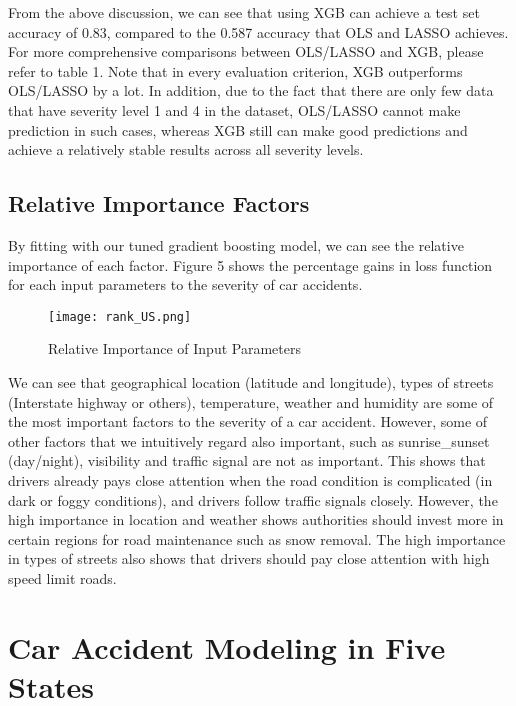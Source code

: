 \documentclass[twocolumn]{article}
\begin{document}
From the above discussion, we can see that using XGB can achieve a test set accuracy of 0.83, compared to the 0.587 accuracy that OLS and LASSO achieves. For more comprehensive comparisons between OLS/LASSO and XGB, please refer to table 1. Note that in every evaluation criterion, XGB outperforms OLS/LASSO by a lot. In addition, due to the fact that there are only few data that have severity level 1 and 4 in the dataset, OLS/LASSO cannot make prediction in such cases, whereas XGB still can make good predictions and achieve a relatively stable results across all severity levels. 


\subsection{Relative Importance Factors}
By fitting with our tuned gradient boosting model, we can see the relative importance of each factor. Figure 5 shows the percentage gains in loss function for each input parameters to the severity of car accidents.

\begin{figure}[h]
    \centering
    \texttt{[image: rank\_US.png]}
    \caption{Relative Importance of Input Parameters}
\end{figure}

We can see that geographical location (latitude and longitude), types of streets (Interstate highway or others), temperature, weather and humidity are some of the most important factors to the severity of a car accident. However, some of other factors that we intuitively regard also important, such as sunrise\_sunset (day/night), visibility and traffic signal are not as important. This shows that drivers already pays close attention when the road condition is complicated (in dark or foggy conditions), and drivers follow traffic signals closely. However, the high importance in location and weather shows authorities should invest more in certain regions for road maintenance such as snow removal. The high importance in types of streets also shows that drivers should pay close attention with high speed limit roads. 


\section{Car Accident Modeling in Five States}
\end{document}

